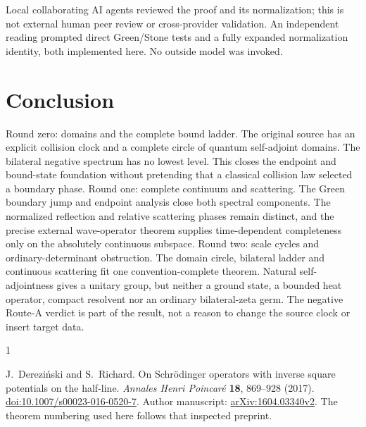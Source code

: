 \documentclass[10pt]{article}
\begin{document}
Local collaborating AI agents reviewed the proof and its normalization;
this is not external human peer review or cross-provider validation.
An independent reading prompted direct Green/Stone tests and a fully expanded
normalization identity, both implemented here. No outside model was invoked.

\section{Conclusion}
\ifcase\CRevisionRound
Round zero: domains and the complete bound ladder.
The original source has an explicit collision clock and a complete circle
of quantum self-adjoint domains. The bilateral negative spectrum has no
lowest level. This closes the endpoint and bound-state foundation without
pretending that a classical collision law selected a boundary phase.
\or
Round one: complete continuum and scattering.
The Green boundary jump and endpoint analysis close both spectral components.
The normalized reflection and relative scattering phases remain distinct,
and the precise external wave-operator theorem supplies time-dependent
completeness only on the absolutely continuous subspace.
\else
Round two: scale cycles and ordinary-determinant obstruction.
The domain circle, bilateral ladder and continuous scattering fit one
convention-complete theorem. Natural self-adjointness gives a unitary group,
but neither a ground state, a bounded heat operator, compact resolvent nor
an ordinary bilateral-zeta germ. The negative Route-A verdict is part of the
result, not a reason to change the source clock or insert target data.
\fi

\begin{thebibliography}{1}
\raggedright
{}
J.~Dereziński and S.~Richard.
On Schrödinger operators with inverse square potentials on the half-line.
\emph{Annales Henri Poincaré} \textbf{18}, 869--928 (2017).
\href{https://doi.org/10.1007/s00023-016-0520-7}{doi:10.1007/s00023-016-0520-7}.
Author manuscript: \href{https://arxiv.org/abs/1604.03340v2}{arXiv:1604.03340v2}.
The theorem numbering used here follows that inspected preprint.
\end{thebibliography}
\end{document}

